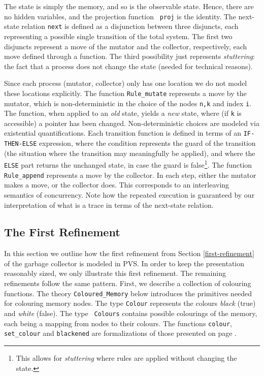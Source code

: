 The state   is simply the memory,  and   so is the observable   state. 
Hence, there are no hidden variables, and the projection function {\tt
  proj} is the identity.      The next-state relation {\tt next}    is
defined as a disjunction between three  disjuncts, each representing a
possible single   transition  of the   total  system.   The  first two
disjuncts represent   a  move  of  the  mutator  and   the  collector,
respectively,  each  move defined  through   a  function.  The   third
possibility just represents {\em stuttering}: the  fact that a process
does not change the state (needed for technical reasons)\@.

Since each process (mutator, collector) only has one location we do not
model these  locations explicitly.    The function {\tt  Rule\_mutate}
represents a move by  the mutator, which  is non-deterministic  in the
choice of the nodes {\tt  n,k} and index  {\tt i}\@.  The function, when
applied to an {\em old\/} state, yields a {\em new\/} state, where (if
{\tt k} is accessible) a  pointer has been changed.  Non-deterministic
choices are modeled via existential quantifications.  Each transition
function is   defined in terms  of  an  {\tt IF-THEN-ELSE} expression,
where the   condition represents the    guard of the  transition  (the
situation where the transition may meaningfully be applied), and where
the {\tt ELSE} part returns the unchanged state, in  case the guard is
false\footnote{This  allows for   {\em  stuttering}  where  rules  are
  applied   without  changing    the  state.}\@.    The function    {\tt
  Rule\_append} represents a  move by  the  collector.  In each  step,
either  the mutator   makes  a move,   or the   collector  does.  This
corresponds to an interleaving semantics of concurrency.  Note how the
repeated execution is  guaranteed by our  interpretation of what  is a
trace in terms of the next-state relation.


\subsection{The First Refinement}

In this  section  we outline  how the  first refinement   from 
Section \ref{first-refinement} of the garbage  collector is  modeled 
in PVS.  
In order to keep the presentation reasonably sized, we only illustrate
this  first refinement.  The    remaining refinements follow the  same
pattern. First, we describe a collection of  colouring functions.  The
theory {\tt Coloured\_Memory}  below introduces the primitives  needed
for  colouring memory  nodes.  The  type  {\tt Colour} represents  the
colours {\em black\/} (true) and {\em white\/} (false)\@.   The type {\tt
Colours} 
contains possible colourings  of the memory,  each being a mapping from
nodes to their colours.  The functions {\tt colour}, {\tt set\_colour}
and  {\tt blackened} are  formalizations of those  presented on page
\pageref{refinement1-functions}\@.

